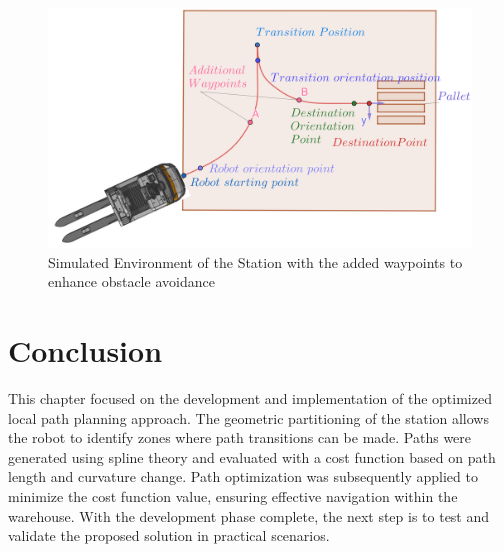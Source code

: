 \begin{figure}[H]
    \begin{center}
        \includegraphics[width=4.5in]{images/Chap2/Add_waypoints.png} %
        \caption{Simulated Environment of the Station with the added waypoints to enhance obstacle avoidance}
        \label{Add_waypoints}
        \end{center}    
\end{figure}




    

\section*{Conclusion}

This chapter focused on the development and implementation of the optimized local path planning 
approach. The geometric partitioning of the station allows the robot to identify zones where path 
transitions can be made. Paths were generated using spline theory and evaluated with a cost function 
based on path length and curvature change. Path optimization was subsequently applied to minimize the cost 
function value, ensuring effective navigation within the warehouse. With the development phase complete, 
the next step is to test and validate the proposed solution in practical scenarios.